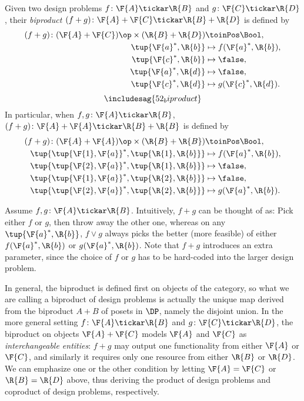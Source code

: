 \begin{definition}
Given two design problems $f\colon \F{A} \tickar \R{B}$ and $g\colon \F{C} \tickar \R{D}$, their \emph{biproduct} $(f + g)\colon \F{A} + \F{C} \tickar \R{B} + \R{D}$ is defined by
\begin{equation}
\begin{aligned}
    (f + g)\colon (\F{A} + \F{C})\op  \times (\R{B} + \R{D}) & \toinPos \Bool,  \\
            \tup{ \F{a}^*, \R{b}} & \mapsto f(\F{a}^*, \R{b}), \\
            \tup{ \F{c}^*, \R{b}} & \mapsto \false, \\
            \tup{ \F{a}^*, \R{d}} & \mapsto \false, \\
            \tup{ \F{c}^*, \R{d}} & \mapsto g(\F{c}^*, \R{d}).
\end{aligned}
\end{equation}
\begin{equation}
    \includesag{52_biproduct}
\end{equation}
In particular, when $f, g\colon \F{A} \tickar \R{B}$, $(f + g)\colon \F{A} + \F{A} \tickar \R{B} + \R{B}$ is defined by
\begin{equation}
\begin{aligned}
    (f + g) \colon (\F{A} + \F{A})\op  \times (\R{B} + \R{B}) & \toinPos \Bool,  \\
            \tup{ \tup{\F{1}, \F{a}}^*, \tup{\R{1}, \R{b}}} & \mapsto f(\F{a}^*, \R{b}), \\
            \tup{ \tup{\F{2}, \F{a}}^*, \tup{\R{1}, \R{b}}} & \mapsto \false, \\
            \tup{ \tup{\F{1}, \F{a}}^*, \tup{\R{2}, \R{b}}} & \mapsto \false, \\
            \tup{ \tup{\F{2}, \F{a}}^*, \tup{\R{2}, \R{b}}} & \mapsto g(\F{a}^*, \R{b}).
\end{aligned}
\end{equation}
\end{definition}


Assume $f,g \colon \F{A} \tickar \R{B}$. Intuitively, $f+g$ can be thought of as: Pick either $f$ or $g$, then throw away the other one, whereas on any $\tup{\F{a}^*,\R{b}}$, $f \vee g$ always picks the better (more feasible) of either $f(\F{a}^*,\R{b})$ or $g(\F{a}^*,\R{b})$. Note that $f+g$ introduces an extra parameter, since the choice of $f$ or $g$ has to be hard-coded into the larger design problem.


In general, the biproduct is defined first on objects of the category, so what we are calling a biproduct of design
problems is actually the unique map derived from the biproduct $A + B$ of posets in $\DP$, namely the disjoint union. In the more general setting $f\colon \F{A} \tickar \R{B}$ and $g \colon \F{C} \tickar \R{D}$, the biproduct on objects $\F{A} + \F{C}$ models $\F{A}$ and $\F{C}$ as \emph{interchangeable entities}: $f+g$ may output one functionality from either $\F{A}$ or $\F{C}$, and similarly it requires only one resource from either $\R{B}$ or $\R{D}$. We can emphasize one or the other condition by letting $\F{A} = \F{C}$ or $\R{B} =\R{D}$ above, thus deriving the product of design problems and coproduct of design problems, respectively.


